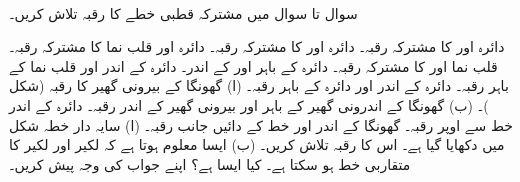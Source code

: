 \\
سوال  تا سوال  میں مشترکہ قطبی خطے کا رقبہ تلاش کریں۔

دائرہ  اور  کا مشترکہ رقبہ۔
دائرہ  اور  کا مشترکہ رقبہ۔
دائرہ  اور قلب نما  کا مشترکہ رقبہ۔
قلب نما  اور  کا مشترکہ رقبہ۔
دائرہ  کے باہر اور  کے اندر۔
دائرہ  کے اندر اور قلب نما  کے باہر رقبہ۔ 
دائرہ  کے اندر اور دائرہ  کے باہر رقبہ۔
(ا) گھونگا  کے بیرونی گھیر کا رقبہ (شکل )۔  (ب) گھونگا  کے اندرونی گھیر کے باہر اور بیرونی گھیر کے اندر رقبہ۔
دائرہ  کے اندر خط  سے اوپر  رقبہ۔
گھونگا کے اندر اور خط  کے دائیں جانب رقبہ۔
(ا) سایہ دار خطہ شکل  میں دکھایا گیا ہے۔ اس  کا رقبہ تلاش کریں۔ (ب) ایسا معلوم ہوتا ہے کہ  لکیر  اور لکیر  کا متقاربی خط ہو سکتا ہے۔ کیا ایسا ہے؟ اپنے جواب کی وجہ پیش کریں۔
